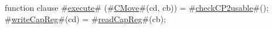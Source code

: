 function clause #\hyperref[zexecute]{execute}# (#\hyperref[zCMove]{CMove}#(cd, cb)) =
{
  #\hyperref[zcheckCP2usable]{checkCP2usable}#();
  #\hyperref[zwriteCapReg]{writeCapReg}#(cd) = #\hyperref[zreadCapReg]{readCapReg}#(cb);
}
